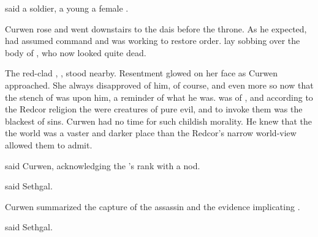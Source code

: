  said a soldier, a young \sphyle\dash a female \scatha.


Curwen rose and went downstairs to the dais before the throne. 
As he expected, \rah[Sethgal] had assumed command and was working to restore order. 
\Rinyuth[\Tiroco] lay sobbing over the body of \rayuth[\Icor], who now looked quite dead. 


The red-clad \soror, \Camilienne, stood nearby. 
Resentment glowed on her face as Curwen approached. 
She always disapproved of him, of course, and even more so now that the stench of \itzach was upon him, a reminder of what he was. 
\Camilienne was of \ClanRedcor, and according to the Redcor religion the \qliphoth were creatures of pure evil, and to invoke them was the blackest of sins. 
Curwen had no time for such childish morality. 
He knew that the the world was a vaster and darker place than the Redcor's narrow world-view allowed them to admit. 

\talk{\Rah[Sethgal],} said Curwen, acknowledging the \scatha's rank with a nod. 

 said Sethgal. 

Curwen summarized the capture of the assassin and the evidence implicating \Onatol. 

 said Sethgal. 

